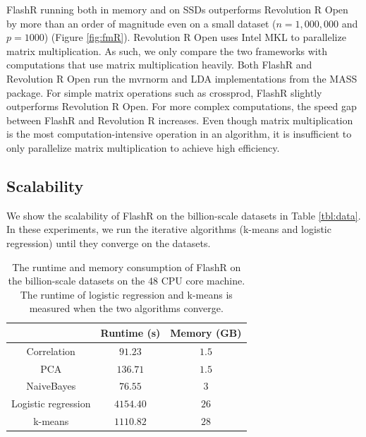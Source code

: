 FlashR running both in memory and on SSDs outperforms Revolution R Open by more
than an order of magnitude even on a small dataset ($n=1,000,000$ and $p=1000$)
(Figure \ref{fig:fmR}).
Revolution R Open uses Intel MKL to parallelize matrix multiplication. As such,
we only compare the two frameworks with computations that use matrix
multiplication heavily. Both FlashR and Revolution R Open run the mvrnorm
and LDA implementations from the MASS package. For simple matrix operations such as crossprod,
FlashR slightly outperforms Revolution R Open. For more complex computations,
the speed gap between FlashR and Revolution R increases. Even though matrix multiplication
is the most computation-intensive operation in an algorithm, it is insufficient
to only parallelize matrix multiplication to achieve high efficiency.

\subsection{Scalability}

We show the scalability of FlashR on the billion-scale datasets in Table
\ref{tbl:data}. In these experiments, we run the iterative algorithms
(k-means and logistic regression) until they converge on the datasets.

\begin{table}
\begin{center}
\footnotesize
\begin{tabular}{|c|c|c|}
\hline
	& Runtime (s) & Memory (GB) \\
\hline
Correlation & $91.23$ & $1.5$ \\
\hline
PCA & $136.71$ & $1.5$ \\
\hline
NaiveBayes & $76.55$ & $3$ \\
\hline
Logistic regression & $4154.40$ & $26$ \\
\hline
k-means & $1110.82$ & $28$ \\
\hline
\end{tabular}
\normalsize
\end{center}
\caption{The runtime and memory consumption of FlashR on the billion-scale
	datasets on the 48 CPU core machine. The runtime of logistic regression
	and k-means is measured when the two algorithms converge.}
\label{tbl:scale}
\end{table}

